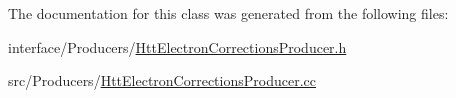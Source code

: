 The documentation for this class was generated from the following files:\begin{DoxyCompactItemize}
\item 
interface/Producers/\hyperlink{HttElectronCorrectionsProducer_8h}{HttElectronCorrectionsProducer.h}\item 
src/Producers/\hyperlink{HttElectronCorrectionsProducer_8cc}{HttElectronCorrectionsProducer.cc}\end{DoxyCompactItemize}
